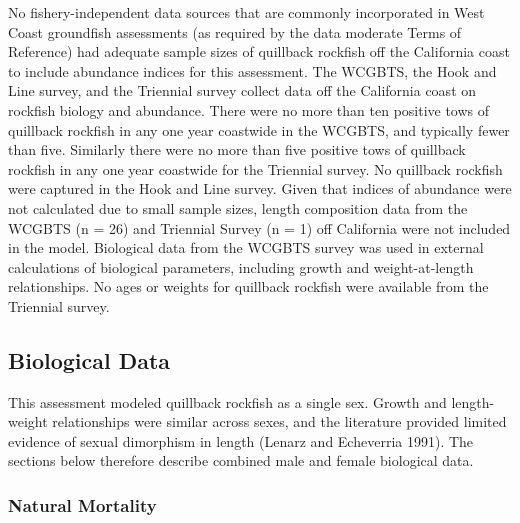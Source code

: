 \documentclass[11pt,
  english,
  letterpaper,
]{article}
\begin{document}
No fishery-independent data sources that are commonly incorporated in West Coast groundfish assessments (as required by the data moderate Terms of Reference) had adequate sample sizes of quillback rockfish off the California coast to include abundance indices for this assessment. The WCGBTS, the Hook and Line survey, and the Triennial survey collect data off the California coast on rockfish biology and abundance. There were no more than ten positive tows of quillback rockfish in any one year coastwide in the WCGBTS, and typically fewer than five. Similarly there were no more than five positive tows of quillback rockfish in any one year coastwide for the Triennial survey. No quillback rockfish were captured in the Hook and Line survey. Given that indices of abundance were not calculated due to small sample sizes, length composition data from the WCGBTS (n = 26) and Triennial Survey (n = 1) off California were not included in the model. Biological data from the WCGBTS survey was used in external calculations of biological parameters, including growth and weight-at-length relationships. No ages or weights for quillback rockfish were available from the Triennial survey.

\leavevmode\tagmcend\tagstructend\par


\hypertarget{biological-data}{%
\subsection{Biological Data}\label{biological-data}}

\leavevmode\tagmcend\tagstructend


This assessment modeled quillback rockfish as a single sex. Growth and length-weight relationships were similar across sexes, and the literature provided limited evidence of sexual dimorphism in length {(Lenarz and Echeverria 1991)\leavevmode\tagmcend\tagstructend}. The sections below therefore describe combined male and female biological data.

\leavevmode\tagmcend\tagstructend\par


\hypertarget{natural-mortality}{%
\subsubsection{Natural Mortality}\label{natural-mortality}}
\end{document}
